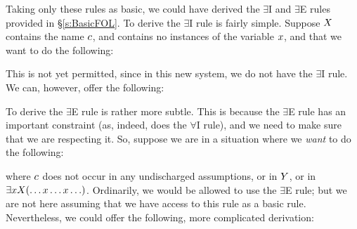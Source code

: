 Taking only these rules as basic, we could have derived the  $\exists$I and $\exists$E rules provided in \S\ref{s:BasicFOL}. To derive the $\exists$I rule is fairly simple. Suppose $X$ contains the name $c$, and contains no instances of the variable $x$, and that we want to do the following:
\begin{pf}
\end{pf}
This is not yet permitted, since in this new system, we do not have the $\exists$I rule. We can, however, offer the following:
\begin{pf}
	\open
	\close
\end{pf}\noindent
To derive the $\exists$E rule is rather more subtle. This is because the $\exists$E rule has an important constraint (as, indeed, does the $\forall$I rule), and we need to make sure that we are respecting it. So, suppose we are in a situation where we \emph{want} to do the following:
\begin{pf}
	\open
	\close
\end{pf}\noindent
 where $c$ does not occur in any undischarged assumptions, or in $Y$, or in $\exists x X(\ldots x \ldots x\ldots)$. Ordinarily, we would be allowed to use the $\exists$E rule; but we are not here assuming that we have access to this rule as a basic rule. Nevertheless, we could offer the following, more complicated derivation:
 
